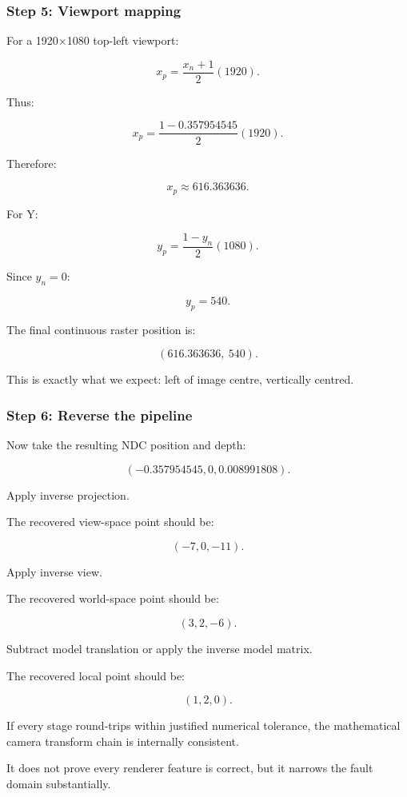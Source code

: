 \subsubsection{Step 5: Viewport mapping}\label{step-5-viewport-mapping}

For a 1920×1080 top-left viewport:

\[ x_p=\frac{x_n+1}{2}(1920). \]

Thus:

\[ x_p= \frac{1-0.357954545}{2}(1920). \]

Therefore:

\[ \boxed{x_p\approx616.363636}. \]

For Y:

\[ y_p=\frac{1-y_n}{2}(1080). \]

Since \(y_n=0\):

\[ \boxed{y_p=540}. \]

The final continuous raster position is:

\[ \boxed{ (616.363636,\ 540). } \]

This is exactly what we expect: left of image centre, vertically centred.

\subsubsection{Step 6: Reverse the pipeline}\label{step-6-reverse-the-pipeline}

Now take the resulting NDC position and depth:

\[ (-0.357954545,0,0.008991808). \]

Apply inverse projection.

The recovered view-space point should be:

\[ \boxed{(-7,0,-11)}. \]

Apply inverse view.

The recovered world-space point should be:

\[ \boxed{(3,2,-6)}. \]

Subtract model translation or apply the inverse model matrix.

The recovered local point should be:

\[ \boxed{(1,2,0)}. \]

If every stage round-trips within justified numerical tolerance, the mathematical camera transform chain is internally consistent.

It does not prove every renderer feature is correct, but it narrows the fault domain substantially.

